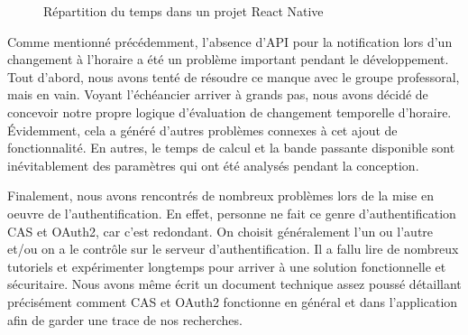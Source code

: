     \begin{figure}[hp] \centering
        
        \caption{Répartition du temps dans un projet React Native}
        \label{fig.react}
    \end{figure}
    
    Comme mentionné précédemment, l'absence d'API pour la notification lors d'un changement à l'horaire a été un problème important pendant le développement. Tout d'abord, nous avons tenté de résoudre ce manque avec le groupe professoral, mais en vain. Voyant l'échéancier arriver à grands pas, nous avons décidé de concevoir notre propre logique d'évaluation de changement temporelle d'horaire. Évidemment, cela a généré d'autres problèmes connexes à cet ajout de fonctionnalité. En autres, le temps de calcul et la bande passante disponible sont inévitablement des paramètres qui ont été analysés pendant la conception.
    
    Finalement, nous avons rencontrés de nombreux problèmes lors de la mise en oeuvre de l'authentification. En effet, personne ne fait ce genre d'authentification CAS et OAuth2, car c'est redondant. On choisit généralement l'un ou l'autre et/ou on a le contrôle sur le serveur d'authentification. Il a fallu lire de nombreux tutoriels et expérimenter longtemps pour arriver à une solution fonctionnelle et sécuritaire. Nous avons même écrit un document technique assez poussé détaillant précisément comment CAS et OAuth2 fonctionne en général et dans l'application afin de garder une trace de nos recherches.
